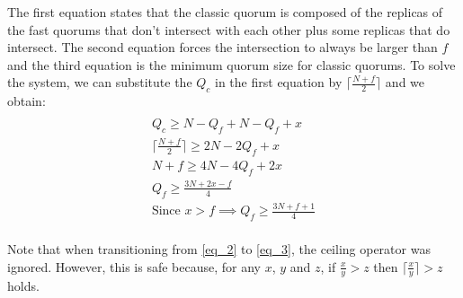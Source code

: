 \documentclass[runningheads,a4paper]{llncs}
\begin{document}
The first equation states that the classic quorum is composed of the replicas of the fast quorums that don't intersect with each other plus some replicas that do intersect. The second equation forces the intersection to always be larger than $f$ and the third equation is the minimum quorum size for classic quorums. To solve the system, we can substitute the $Q_c$ in the first equation by $\lceil \frac{N+f}{2}\rceil$ and we obtain:
\begin{gather*} \\
	Q_c \geq N - Q_f + N-Q_f + x \label{eq_1} \tag{1} \\ 
	\lceil\frac{N+f}{2}\rceil \geq 2N - 2Q_f + x \label{eq_2} \tag{2} \\
	N+f \geq 4N - 4Q_f + 2x \label{eq_3} \tag{3} \\
	Q_f \geq \frac{3N+2x-f}{4} \label{eq_4} \tag{4} \\ 
	\text{Since $x > f$} \implies Q_f \geq \frac{3N+f+1}{4} \label{eq_5} \tag{5}  \\
\end{gather*}

Note that when transitioning from \eqref{eq_2} to \eqref{eq_3}, the ceiling operator was ignored. However, this is safe because, for any $x$, $y$ and $z$, if $\frac{x}{y} > z$ then $\lceil \frac{x}{y} \rceil > z$ holds.\par
\end{document}
